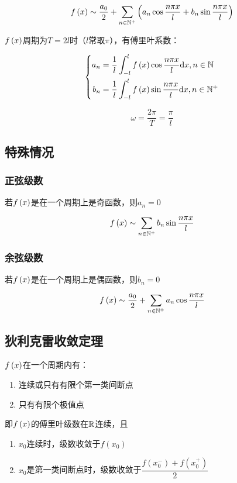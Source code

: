 \documentclass{article}
\begin{document}
\[f\left(x\right)\sim\frac{a_0}2+\sum_{n\in\mathbb N^+}\left(a_n\cos\frac{n\pi x}l+b_n\sin\frac{n\pi x}l\right)\]

$f\left(x\right)$周期为$T=2l$时（$l$常取$\pi$），有傅里叶系数：

\[\left\{\begin{aligned}
        a_n & =\frac1l\int_{-l}^lf\left(x\right)\cos\frac{n\pi x}l\mathrm d x,n\in\mathbb N  \\
        b_n & =\frac1l\int_{-l}^lf\left(x\right)\sin\frac{n\pi x}l\mathrm d x,n\in\mathbb N^+
    \end{aligned}\right.\]

\[\omega=\frac{2\pi}T=\frac\pi l\]

\subsection{特殊情况}

\subsubsection{正弦级数}

若$f\left(x\right)$是在一个周期上是奇函数，则$a_n=0$

\[f\left(x\right)\sim\sum_{n\in\mathbb N^+}b_n\sin\frac{n\pi x}l\]

\subsubsection{余弦级数}

若$f\left(x\right)$是在一个周期上是偶函数，则$b_n=0$

\[f\left(x\right)\sim\frac{a_0}2+\sum_{n\in\mathbb N^+}a_n\cos\frac{n\pi x}l\]

\subsection{狄利克雷收敛定理}

$f\left(x\right)$在一个周期内有：

\begin{enumerate}
    \item 连续或只有有限个第一类间断点
    \item 只有有限个极值点
\end{enumerate}

即$f\left(x\right)$的傅里叶级数在$\mathbb R$连续，且

\begin{enumerate}
    \item $x_0$连续时，级数收敛于$f(x_0)$
    \item $x_0$是第一类间断点时，级数收敛于$\dfrac{f(x_0^-)+f(x_0^+)}2$
\end{enumerate}
\end{document}
